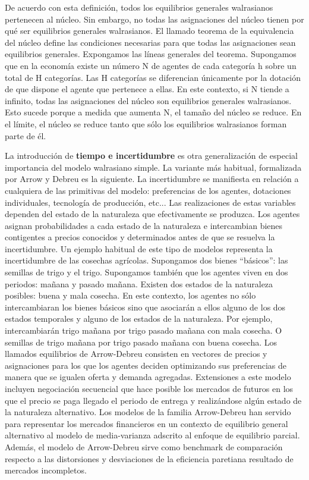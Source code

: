 \documentclass{nuevotema}
\begin{document}
De acuerdo con esta definición, todos los equilibrios generales walrasianos pertenecen al núcleo. Sin embargo, no todas las asignaciones del núcleo tienen por qué ser equilibrios generales walrasianos. El llamado teorema de la equivalencia del núcleo define las condiciones necesarias para que todas las asignaciones sean equilibrios generales. Expongamos las líneas generales del teorema. Supongamos que en la economía existe un número N de agentes de cada categoría h sobre un total de H categorías. Las H categorías se diferencian únicamente por la dotación de que dispone el agente que pertenece a ellas. En este contexto, si N tiende a infinito, todas las asignaciones del núcleo son equilibrios generales walrasianos. Esto sucede porque a medida que aumenta N, el tamaño del núcleo se reduce. En el límite, el núcleo se reduce tanto que sólo los equilibrios walrasianos forman parte de él.

La introducción de \textbf{tiempo e incertidumbre} es otra generalización de especial importancia del modelo walrasiano simple. La variante más habitual, formalizada por Arrow y Debreu es la siguiente. La incertidumbre se manifiesta en relación a cualquiera de las primitivas del modelo: preferencias de los agentes, dotaciones individuales, tecnología de producción, etc... Las realizaciones de estas variables dependen del estado de la naturaleza que efectivamente se produzca. Los agentes asignan probabilidades a cada estado de la naturaleza e intercambian bienes contigentes a precios conocidos y determinados antes de que se resuelva la incertidumbre. Un ejemplo habitual de este tipo de modelos representa la incertidumbre de las cosechas agrícolas. Supongamos dos bienes ``básicos'': las semillas de trigo y el trigo. Supongamos también que los agentes viven en dos periodos: mañana y pasado mañana. Existen dos estados de la naturaleza posibles: buena y mala cosecha. En este contexto, los agentes no sólo intercambiaran los bienes básicos sino que asociarán a ellos alguno de los dos estados temporales y alguno de los estados de la naturaleza. Por ejemplo, intercambiarán trigo mañana por trigo pasado mañana con mala cosecha. O semillas de trigo mañana por trigo pasado mañana con buena cosecha. Los llamados equilibrios de Arrow-Debreu consisten en vectores de precios y asignaciones para los que los agentes deciden optimizando sus preferencias de manera que se igualen oferta y demanda agregadas. Extensiones a este modelo incluyen negociación secuencial que hace posible los mercados de futuros en los que el precio se paga llegado el periodo de entrega y realizándose algún estado de la naturaleza alternativo. Los modelos de la familia Arrow-Debreu han servido para representar los mercados financieros en un contexto de equilibrio general alternativo al modelo de media-varianza adscrito al enfoque de equilibrio parcial. Además, el modelo de Arrow-Debreu sirve como benchmark de comparación respecto a las distorsiones y desviaciones de la eficiencia paretiana resultado de mercados incompletos.
\end{document}
